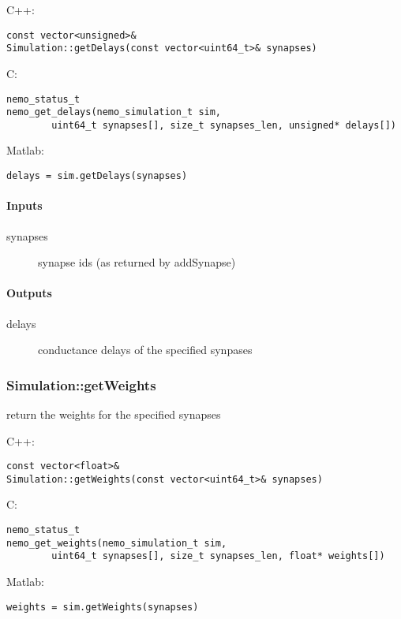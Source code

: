 \noindent C++:
\begin{lstlisting}[aboveskip=2pt]
const vector<unsigned>&
Simulation::getDelays(const vector<uint64_t>& synapses)
\end{lstlisting}

\noindent C:
\begin{lstlisting}[aboveskip=2pt]
nemo_status_t
nemo_get_delays(nemo_simulation_t sim, 
        uint64_t synapses[], size_t synapses_len, unsigned* delays[])
\end{lstlisting}

\noindent Matlab:
\begin{lstlisting}[aboveskip=2pt]
delays = sim.getDelays(synapses)
\end{lstlisting}
\paragraph{Inputs}
\begin{description}
\item[synapses] synapse ids (as returned by addSynapse)
\end{description}
\paragraph{Outputs}
\begin{description}
\item[delays] conductance delays of the specified synpases
\end{description}

\clearpage
\subsubsection*{Simulation::getWeights}
\label{fn: getWeights}
return the weights for the specified synapses


\noindent C++:
\begin{lstlisting}[aboveskip=2pt]
const vector<float>&
Simulation::getWeights(const vector<uint64_t>& synapses)
\end{lstlisting}

\noindent C:
\begin{lstlisting}[aboveskip=2pt]
nemo_status_t
nemo_get_weights(nemo_simulation_t sim, 
        uint64_t synapses[], size_t synapses_len, float* weights[])
\end{lstlisting}

\noindent Matlab:
\begin{lstlisting}[aboveskip=2pt]
weights = sim.getWeights(synapses)
\end{lstlisting}
